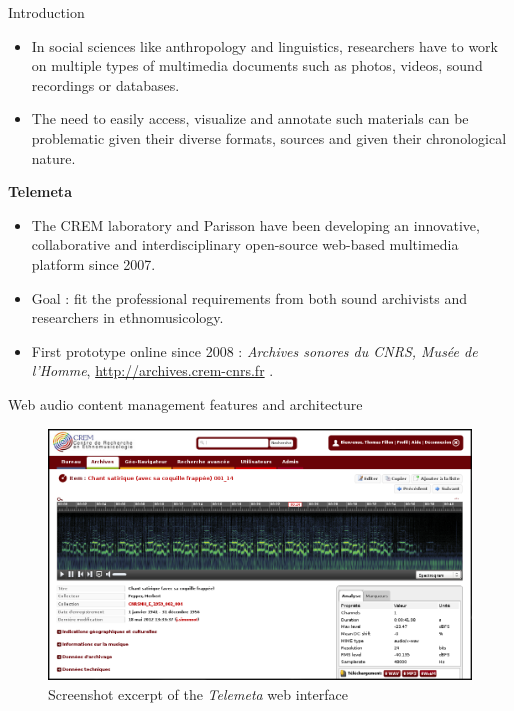 \documentclass[final, hyperref, table]{beamer}
\begin{document}
\begin{frame}{}
  \begin{columns}[t]

 \begin{column}[T]{.49\linewidth}
    \begin{block}{Introduction}\small
    
      \begin{itemize}
      \item In social sciences like anthropology and linguistics,
        researchers have to work on multiple types of multimedia
        documents such as photos, videos, sound recordings or
        databases.
      \item The need to easily access, visualize and annotate
        such materials can be problematic given their diverse formats,
        sources and given their chronological nature.
      \end{itemize}
\textbf{Telemeta}\\
\begin{itemize}
\item The CREM laboratory and Parisson have been developing an innovative,
  collaborative and interdisciplinary open-source web-based multimedia
  platform since 2007.
\item Goal : fit the professional requirements from both sound archivists and
  researchers in ethnomusicology.
\item First prototype online since 2008 : \emph{Archives sonores du CNRS, Musée de
    l'Homme}, \url{http://archives.crem-cnrs.fr} .
\end{itemize}

    \end{block}

\begin{block}{Web audio content management features and architecture}\small
\begin{figure}[htbp]
  \centering
  \includegraphics[width=0.4\paperwidth]{../img/telemeta.png}
  \caption{Screenshot excerpt of the \emph{Telemeta} web interface}\label{fig:Telemeta}
\end{figure}


\end{block}
\end{column}
\end{columns}
\end{frame}
\end{document}
